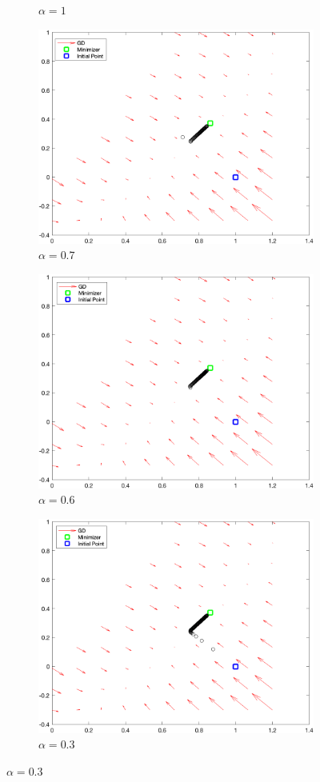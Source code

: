 \documentclass{article}
\begin{document}
\begin{figure}[htp]
\begin{subfigure}{.5\textwidth}
		\caption{$ \alpha = 1 $}
	\end{subfigure}
	\begin{subfigure}{.5\textwidth}
		\centering
		\includegraphics[width=.8\linewidth]{figs/Q2_70.png}
		\caption{$ \alpha = 0.7 $}
	\end{subfigure}
	\begin{subfigure}{.5\textwidth}
		\centering
		\includegraphics[width=.8\linewidth]{figs/Q2_60.png}
		\caption{$ \alpha = 0.6 $}
	\end{subfigure}
	\begin{subfigure}{.5\textwidth}
		\centering
		\includegraphics[width=.8\linewidth]{figs/Q2_30.png}
		\caption{$ \alpha = 0.3 $}
	\end{subfigure}
	

\end{figure}
\end{document}
